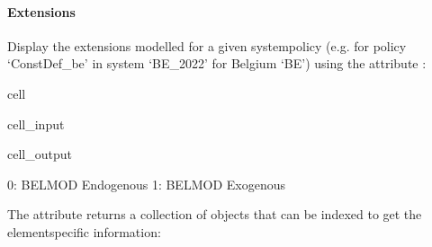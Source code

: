 \documentclass[letterpaper,10pt,english]{sphinxmanual}
\begin{document}
\paragraph{Extensions}
\label{\detokenize{notebooks/userguide:id4}}
\sphinxAtStartPar
Display the extensions modelled for a given system\sphinxhyphen{}policy (e.g. for policy ‘ConstDef\_be’ in system ‘BE\_2022’ for Belgium ‘BE’) using the attribute :

\begin{sphinxuseclass}{cell}
\begin{sphinxuseclass}{cell_input}
\begin{sphinxVerbatim}[commandchars=\\\{\}]
\PYG{p}{[}\PYG{p}{]}\PYG{p}{[}\PYG{p}{]}\PYG{p}{[}\PYG{p}{]}
\end{sphinxVerbatim}

\end{sphinxuseclass}
\begin{sphinxuseclass}{cell_output}
\begin{sphinxVerbatim}[commandchars=\\\{\}]
0: BELMOD \PYGZhy{} Endogenous
1: BELMOD \PYGZhy{} Exogenous 
\end{sphinxVerbatim}

\end{sphinxuseclass}
\end{sphinxuseclass}
\sphinxAtStartPar
The attribute returns a collection of  objects that can be indexed to get the element\sphinxhyphen{}specific information:
\end{document}
